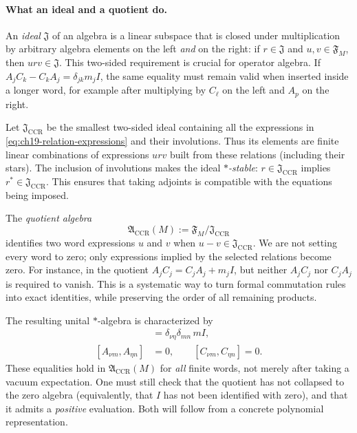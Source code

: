\paragraph{What an ideal and a quotient do.}
An \emph{ideal} $\mathfrak J$ of an algebra is a linear subspace that is
closed under multiplication by arbitrary algebra elements on the left
\emph{and} on the right: if $r\in\mathfrak J$ and $u,v\in\mathfrak F_M$,
then $urv\in\mathfrak J$.  This two-sided requirement is crucial for
operator algebra.  If $A_jC_k-C_kA_j=\delta_{jk}m_j I$, the same equality
must remain valid when inserted inside a longer word, for example after
multiplying by $C_\ell$ on the left and $A_p$ on the right.

Let $\mathfrak J_{\mathrm{CCR}}$ be the smallest two-sided ideal
containing all the expressions in
\eqref{eq:ch19-relation-expressions} and their involutions.  Thus its
elements are finite linear combinations of expressions $urv$ built from
these relations (including their stars).  The inclusion of involutions
makes the ideal \emph{$*$-stable}: $r\in\mathfrak J_{\mathrm{CCR}}$
implies $r^*\in\mathfrak J_{\mathrm{CCR}}$.  This ensures that taking
adjoints is compatible with the equations being imposed.

The \emph{quotient algebra}
\begin{equation}
 \mathfrak A_{\mathrm{CCR}}(M)
   :=\mathfrak F_M/\mathfrak J_{\mathrm{CCR}}
 \label{eq:ch19-ccr-quotient}
\end{equation}
identifies two word expressions $u$ and $v$ when
$u-v\in\mathfrak J_{\mathrm{CCR}}$.  We are not setting every word to
zero; only expressions implied by the selected relations become zero.
For instance, in the quotient $A_jC_j=C_jA_j+m_j I$, but neither
$A_jC_j$ nor $C_jA_j$ is required to vanish.  This is a systematic way
to turn formal commutation rules into exact identities, while preserving
the order of all remaining products.

The resulting unital $*$-algebra is characterized by
\begin{align}
 [A_{\nu m},C_{\eta n}]
   &=\delta_{\nu\eta}\delta_{mn}\,mI,\nonumber\\
 [A_{\nu m},A_{\eta n}]&=0,
 \qquad [C_{\nu m},C_{\eta n}]=0.
 \label{eq:ch19-abstract-ccr}
\end{align}
These equalities hold in $\mathfrak A_{\mathrm{CCR}}(M)$ for \emph{all}
finite words, not merely after taking a vacuum expectation.
One must still check that the quotient has not collapsed to the zero
algebra (equivalently, that $I$ has not been identified with zero), and
that it admits a \emph{positive} evaluation.  Both will follow from a
concrete polynomial representation.

